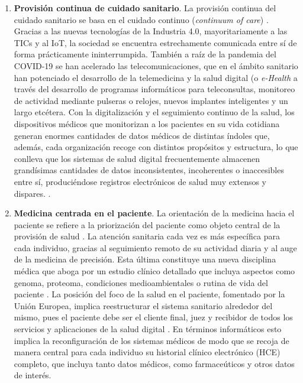 \begin{enumerate}

\item \textbf{Provisión continua de cuidado sanitario}. La provisión continua del cuidado sanitario se basa en el cuidado continuo (\textit{continuum of care}) \cite{kouroubali2019new}. Gracias a las nuevas tecnologías de la Industria 4.0, mayoritariamente a las TICs y al IoT, la sociedad se encuentra estrechamente comunicada entre sí de forma prácticamente ininterrumpida. También a raíz de la pandemia del COVID-19 se han acelerado las telecomunicaciones, que en el ámbito sanitario han potenciado el desarrollo de la telemedicina y la salud digital (o \textit{e-Health} \cite{martin2021ehealth} a través del desarrollo de programas informáticos para teleconsultas, monitoreo de actividad mediante pulseras o relojes, nuevos implantes inteligentes y un largo etcétera. Con la digitalización y el seguimiento continuo de la salud, los dispositivos médicos que monitorizan a los pacientes en su vida cotidiana generan enormes cantidades de datos médicos de distintas índoles que, además, cada organización recoge con distintos propósitos y estructura, lo que conlleva que los sistemas de salud digital frecuentemente almacenen grandísimas cantidades de datos inconsistentes, incoherentes o inaccesibles entre sí, produciéndose registros electrónicos de salud muy extensos y dispares. \cite{kouroubali2019new}.

\item \textbf{Medicina centrada en el paciente}. La orientación de la medicina hacia el paciente se refiere a la priorización del paciente como objeto central de la provisión de salud  \cite{tortorella2020healthcare}. La atención sanitaria cada vez es más específica para cada individuo, gracias al seguimiento remoto de su actividad diaria y al auge de la medicina de precisión. Esta última constituye una nueva disciplina médica que aboga por un estudio clínico detallado que incluya aspectos como genoma, proteoma, condiciones medioambientales o rutina de vida del paciente \cite{ruiz2023inteligencia}. La posición del foco de la salud en el paciente, fomentado por la Unión Europea,  implica reestructurar el sistema sanitario alrededor del mismo, pues el paciente debe ser el cliente final, juez y recibidor de todos los servicios y aplicaciones de la salud digital \cite{ntafi2022legal} \cite{katehakis2019framework}. En términos informáticos esto implica la reconfiguración de los sistemas médicos de modo que se recoja de manera central para cada individuo su historial clínico electrónico (HCE) completo, que incluya tanto datos médicos, como farmaceúticos y otros datos de interés.  


\end{enumerate}
